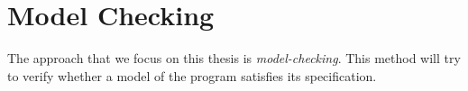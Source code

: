 \chapter{Model Checking}
\label{section:model:checking}
%
%
%
The approach that we focus on this thesis is
\emph{model-checking}.
%
%
This method will try to verify whether a model of the program
satisfies its specification.
%
%
 
